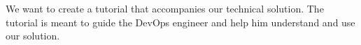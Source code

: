 We want to create a tutorial that accompanies our technical solution.
The tutorial is meant to guide the DevOps engineer and help him
understand and use our solution. 
